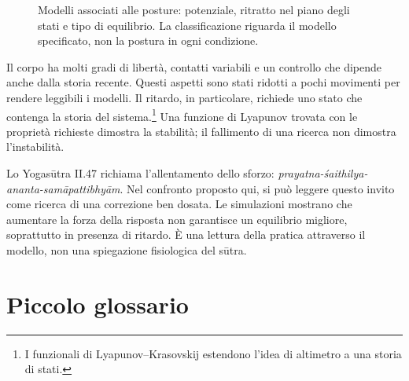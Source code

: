 \documentclass[11pt,a4paper,twoside=false,headinclude,footinclude]{scrartcl}
\newcommand{\pittUrdhva}[1][]{%
  \begin{scope}[#1]
    \draw[corpo] (-0.14,0) -- (0.02,0);
    \draw[corpo] (0,0) -- (0.10,0.78);
    \draw[corpo] (0.10,0.78) .. controls (0.30,1.10) and (0.62,1.16) .. (0.86,1.02);
    \draw[corpo] (0.86,1.02) -- (1.22,0.58) -- (1.26,0) -- (1.48,0);
    \fill[testa] (0.24,0.55) circle (0.14);
  \end{scope}}
\begin{document}
\begin{figure}[htbp]
{%
}
\caption{Modelli associati alle posture: potenziale, ritratto nel piano degli stati e tipo di equilibrio. La classificazione riguarda il modello specificato, non la postura in ogni condizione.}
\label{fig:riepilogo}
\end{figure}

Il corpo ha molti gradi di libertà, contatti variabili e un controllo che dipende anche dalla storia recente. Questi aspetti sono stati ridotti a pochi movimenti per rendere leggibili i modelli. Il ritardo, in particolare, richiede uno stato che contenga la storia del sistema.\footnote{I funzionali di Lyapunov--Krasovskij estendono l'idea di altimetro a una storia di stati.} Una funzione di Lyapunov trovata con le proprietà richieste dimostra la stabilità; il fallimento di una ricerca non dimostra l'instabilità.

Lo Yogasūtra II.47 richiama l'allentamento dello sforzo: \emph{prayatna-śaithilya-ananta-samāpattibhyām}. Nel confronto proposto qui, si può leggere questo invito come ricerca di una correzione ben dosata. Le simulazioni mostrano che aumentare la forza della risposta non garantisce un equilibrio migliore, soprattutto in presenza di ritardo. È una lettura della pratica attraverso il modello, non una spiegazione fisiologica del sūtra.

\section*{Piccolo glossario}
\end{document}
